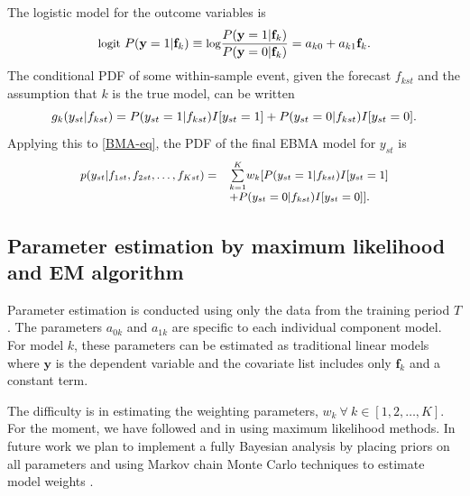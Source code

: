 The logistic model for the outcome variables is %
\begin{equation} \small
\label{one}
\mbox{logit } P(\mathbf{y}=1|\mathbf{f}_k) \equiv \mbox{log}\frac{P(\mathbf{y}=1|\mathbf{f}_k)}{P(\mathbf{y}=0|\mathbf{f}_k)} = a_{k0}+a_{k1}\mathbf{f}_k .
\end{equation}
\noindent The conditional PDF of some within-sample event, given the
forecast $f_{kst}$ and the assumption that $k$ is the true model, can
be written
\begin{equation} 
\label{component-eq}
\small
g_k(y_{st}|f_{kst}) = P(y_{st}=1|f_{kst})I[y_{st}=1]  + P(y_{st}=0|f_{kst})I[y_{st}=0].
\end{equation}
Applying this to \eqref{BMA-eq}, the PDF of the final EBMA model for
$y_{st}$ is
\begin{equation}
\label{pdf}
\small
\begin{array}{rl}
p(y_{st}|f_{1st}, f_{2st}, \ldots, f_{Kst}) = &
\overset{K}{\underset{k=1}{\sum}} w_k [
P(y_{st}=1|f_{kst})I[y_{st}=1] \\
& + P(y_{st}=0|f_{kst})I[y_{st}=0]].\end{array}
\end{equation}

\subsection{Parameter estimation by maximum likelihood and EM
algorithm}

Parameter estimation is conducted using only the data from the
training period $T$.  The parameters $a_{0k}$ and $a_{1k}$ are
specific to each individual component model.  For model $k$, these
parameters can be estimated as traditional linear models where
$\mathbf{y}$ is the dependent variable and the covariate list includes
only $\mathbf{f}_k$ and a constant term.

The difficulty is in estimating the weighting parameters,
$w_k~\forall~ k \in [1, 2, \dots, K]$. For the moment, we have
followed \citet{Raftery:2005} and \citet{Sloughter:2007} in using
maximum likelihood methods. In future work we plan to implement a
fully Bayesian analysis by placing priors on all parameters and using
Markov chain Monte Carlo techniques to estimate model weights
\citep[c.f.][]{Vrugt:2008}.

